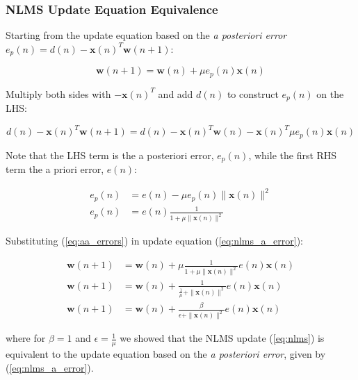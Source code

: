 \documentclass[12pt]{article}
\def\vw{{\bm{w}}}
\begin{document}
		\subsubsection{NLMS Update Equation Equivalence}
			Starting from the update equation based on the \textit{a posteriori error} $e_{p}(n) = d(n) - \mathbf{x}(n)^{T} \vw(n + 1)$:
			
			\begin{equation}
			\vw(n + 1) = \vw(n) + \mu e_{p}(n) \mathbf{x}(n)
			\label{eq:nlms_a_error}
			\end{equation}
			
			Multiply both sides with $-\mathbf{x}(n)^{T}$ and add $d(n)$ to construct $e_{p}(n)$ on the LHS:
			
			\begin{equation}
			d(n) - \mathbf{x}(n)^{T} \vw(n + 1) = d(n) - \mathbf{x}(n)^{T} \vw(n) - \mathbf{x}(n)^{T} \mu e_{p}(n) \mathbf{x}(n)
			\end{equation}
			
			Note that the LHS term is the a posteriori error, $e_{p}(n)$, while the first RHS term the a priori error, $e(n)$:
			
			\begin{align}
			e_{p}(n)    &= e(n) - \mu e_{p}(n) \| \mathbf{x}(n) \|^{2} \\
			e_{p}(n)    &= e(n) \frac{1}{1 + \mu \| \mathbf{x}(n) \|^{2}}
			\label{eq:aa_errors}
			\end{align}
			
			Substituting (\ref{eq:aa_errors}) in update equation (\ref{eq:nlms_a_error}):
			
			\begin{align}
			\vw(n + 1)  &= \vw(n) + \mu \frac{1}{1 + \mu \| \mathbf{x}(n) \|^{2}} e(n) \mathbf{x}(n) \\
			\vw(n + 1)  &= \vw(n) + \frac{1}{\frac{1}{\mu} + \| \mathbf{x}(n) \|^{2}} e(n) \mathbf{x}(n) \\
			\vw(n + 1)  &= \vw(n) + \frac{\beta}{\epsilon + \| \mathbf{x}(n) \|^{2}} e(n) \mathbf{x}(n) \label{eq:nlms}
			\end{align}
			
			where for $\beta = 1$ and $\epsilon = \frac{1}{\mu}$ we showed that the NLMS update (\ref{eq:nlms}) is equivalent to the update equation based on the \textit{a posteriori error},
			given by (\ref{eq:nlms_a_error}).
		
\end{document}

